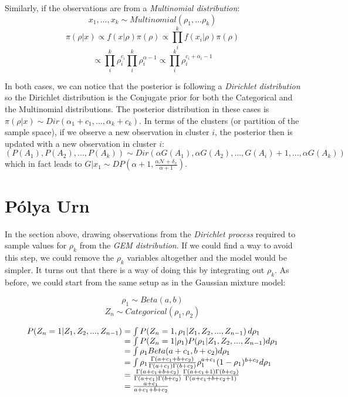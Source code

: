 \documentclass[12pt,a4paper]{article}
\begin{document}
Similarly, if the observations are from a \textit{Multinomial distribution}:
$$x_{1}, ... ,x_{k} \sim Multinomial(\rho_{1}, ... \rho_{k})$$
$$\displaystyle \pi(\rho|x) \propto f(x|\rho)\pi(\rho) \propto \prod_{i}^{k} f(x_{i}| \rho)\pi(\rho) $$
$$ \propto \prod_{i}^{k} \rho_{i}^{c_{i}} \prod_{i}^{k} \rho_{i}^{\alpha - 1} \propto \prod_{i}^{k} \rho_{i}^{c_{i} + \alpha_{i} - 1}$$ 

In both cases, we can notice that the posterior is following a \textit{Dirichlet distribution} so the Dirichlet distribution is the Conjugate prior for both the Categorical and the Multinomial distributions. The posterior distribution in these cases is $\pi(\rho|x) \sim Dir(\alpha_{1} + c_{1}, ..., \alpha_{k} + c_{k})$. In terms of the clusters (or partition of the sample space), if we observe a new observation in cluster $i$, the posterior then is updated with a new observation in cluster $i$:
$$(P(A_{1}), P(A_{2}), ... , P(A_{k})) \sim Dir(\alpha G(A_{1}), \alpha G(A_{2}), ..., G(A_{i}) + 1, ..., \alpha G(A_{k}))$$ which in fact leads to $ G|x_{1} \sim DP(\alpha + 1, \frac{\alpha \mathcal{N} + \delta_{x}}{\alpha + 1})$.

\section{Pólya Urn}

In the section above, drawing observations from the \textit{Dirichlet process} required to sample values for $\rho_{k}$ from the \textit{GEM distribution}. If we could find a way to avoid this step, we could remove the $\rho_{k}$ variables altogether and the model would be simpler. It turns out that there is a way of doing this by integrating out $\rho_{k}$. As before, we could start from the same setup as in the Gaussian mixture model:

$$\rho_{1} \sim Beta(a, b)$$
$$Z_{n} \sim Categorical(\rho_{1}, \rho_{2})$$

\begin{align*}
\begin{array}{l@{{}={}}l}
    P(Z_{n} = 1|Z_{1}, Z_{2}, ..., Z_{n-1})
    & \int P(Z_{n} = 1, \rho_{1}|Z_{1}, Z_{2}, ..., Z_{n-1}) \,d\rho_{1} \\
    & \int P(Z_{n} = 1|\rho_{1})P(\rho_{1}|Z_{1}, Z_{2}, ..., Z_{n-1}) d\rho_{1} \\
    & \int \rho_{1} Beta(a + c_{1}, b + c_{2})d\rho_{1} \\
    & \int \rho_{1} \frac{\Gamma(a + c_{1} + b + c_{2})}{\Gamma(a+c_{1})\Gamma(b+c_{2})}\rho_{1}^{a+c_{1}}(1-\rho_{1})^{b+c_{2}} d\rho_{1} \\
    & \frac{\Gamma(a + c_{1} + b + c_{2})}{\Gamma(a+c_{1})\Gamma(b+c_{2})} \frac{\Gamma(a+c_{1}+1)\Gamma(b+c_{2})}{\Gamma(a + c_{1} + b + c_{2}+1)} \\
    & \frac{a + c_{1}}{a + c_{1} + b + c_{2}}
\end{array}
\end{align*}
\end{document}
